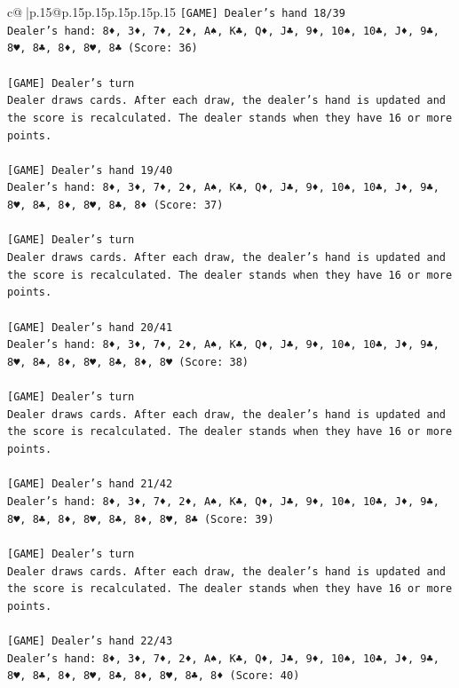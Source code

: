 \documentclass{article}
\begin{document}
{\begin{supertabular}{c@{$\;$}|p{.15\linewidth}@{}p{.15\linewidth}p{.15\linewidth}p{.15\linewidth}p{.15\linewidth}p{.15\linewidth}}
{{{\texttt{{[}GAME{]} Dealer's hand 18/39} \\
\texttt{Dealer's hand: 8♦, 3♦, 7♦, 2♦, A♠, K♣, Q♦, J♣, 9♦, 10♠, 10♣, J♦, 9♣, 8♥, 8♣, 8♦, 8♥, 8♣ (Score: 36)} \\
\\ 
\texttt{{[}GAME{]} Dealer's turn} \\
\texttt{Dealer draws cards. After each draw, the dealer's hand is updated and the score is recalculated. The dealer stands when they have 16 or more points.} \\
\\ 
\texttt{{[}GAME{]} Dealer's hand 19/40} \\
\texttt{Dealer's hand: 8♦, 3♦, 7♦, 2♦, A♠, K♣, Q♦, J♣, 9♦, 10♠, 10♣, J♦, 9♣, 8♥, 8♣, 8♦, 8♥, 8♣, 8♦ (Score: 37)} \\
\\ 
\texttt{{[}GAME{]} Dealer's turn} \\
\texttt{Dealer draws cards. After each draw, the dealer's hand is updated and the score is recalculated. The dealer stands when they have 16 or more points.} \\
\\ 
\texttt{{[}GAME{]} Dealer's hand 20/41} \\
\texttt{Dealer's hand: 8♦, 3♦, 7♦, 2♦, A♠, K♣, Q♦, J♣, 9♦, 10♠, 10♣, J♦, 9♣, 8♥, 8♣, 8♦, 8♥, 8♣, 8♦, 8♥ (Score: 38)} \\
\\ 
\texttt{{[}GAME{]} Dealer's turn} \\
\texttt{Dealer draws cards. After each draw, the dealer's hand is updated and the score is recalculated. The dealer stands when they have 16 or more points.} \\
\\ 
\texttt{{[}GAME{]} Dealer's hand 21/42} \\
\texttt{Dealer's hand: 8♦, 3♦, 7♦, 2♦, A♠, K♣, Q♦, J♣, 9♦, 10♠, 10♣, J♦, 9♣, 8♥, 8♣, 8♦, 8♥, 8♣, 8♦, 8♥, 8♣ (Score: 39)} \\
\\ 
\texttt{{[}GAME{]} Dealer's turn} \\
\texttt{Dealer draws cards. After each draw, the dealer's hand is updated and the score is recalculated. The dealer stands when they have 16 or more points.} \\
\\ 
\texttt{{[}GAME{]} Dealer's hand 22/43} \\
\texttt{Dealer's hand: 8♦, 3♦, 7♦, 2♦, A♠, K♣, Q♦, J♣, 9♦, 10♠, 10♣, J♦, 9♣, 8♥, 8♣, 8♦, 8♥, 8♣, 8♦, 8♥, 8♣, 8♦ (Score: 40)} \\
}}}
\end{supertabular}}
\end{document}
